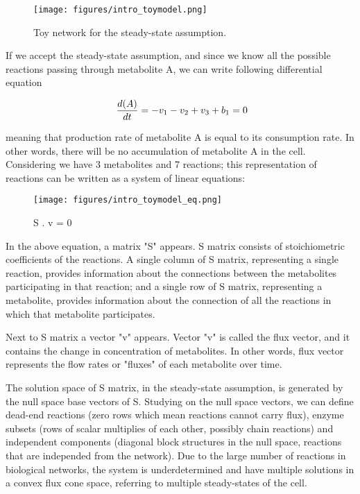 \begin{figure}[h]
\begin{center}
\texttt{[image: figures/intro\_toymodel.png]}
\end{center}
\caption[Toy network for the steady-state assumption]{Toy network for the steady-state assumption.}
\label{fig:ToyNetwork}
\end{figure}

If we accept the steady-state assumption, and since we know all the possible reactions passing through metabolite A, we can write following differential equation

\begin{equation}
 \ \frac{d(A)}{dt} = - v_1 - v_2 + v_3 + b_1 = 0 \\
\end{equation}


meaning that production rate of metabolite A is equal to its consumption rate. In other words, there will be no accumulation of metabolite A in the cell. Considering we have 3 metabolites and 7 reactions; this representation of reactions can be written as a system of linear equations:
\begin{figure}[h]
\texttt{[image: figures/intro\_toymodel\_eq.png]}
\begin{center}S . v = 0 \end{center}
\end{figure}

In the above equation, a matrix "S" appears. S matrix consists of stoichiometric coefficients of the reactions. A single column of S matrix, representing a single reaction, provides information about the connections between the metabolites participating in that reaction; and a single row of S matrix, representing a metabolite, provides information about the connection of all the reactions in which that metabolite participates.

Next to S matrix a vector "v" appears. Vector "v" is called the flux vector, and it contains the change in concentration of metabolites. In other words, flux vector represents the flow rates or "fluxes" of each metabolite over time.

The solution space of S matrix, in the steady-state assumption, is generated by the null space base vectors of S. Studying on the null space vectors, we can define dead-end reactions (zero rows which mean reactions cannot carry flux), enzyme subsets (rows of scalar multiplies of each other, possibly chain reactions) and independent components (diagonal block structures in the null space, reactions that are independed from the network). Due to the large number of reactions in biological networks, the system is underdetermined and have multiple solutions in a convex flux cone space, referring to multiple steady-states of the cell.

